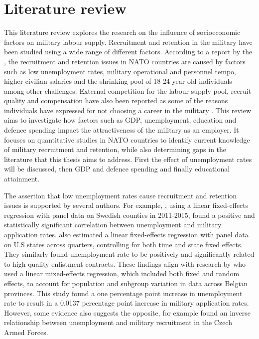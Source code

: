 \chapter{Literature review}

This literature review explores the research on the influence of socioeconomic 
factors on military labour supply. 
Recruitment and retention in the military have been studied using a wide range of
different factors. According to a report by the \textcite{nato_research_and_technology_organization_recruiting_2007}, 
the recruitment and retention issues in NATO countries are 
caused by factors such as low unemployment rates, military operational and personnel tempo,
higher civilian salaries and the shrinking pool of 18-24 year old individuals - among 
other challenges. External
competition for the labour supply pool, recruit quality and compensation have also been 
reported as some of the reasons
individuals have expressed for not choosing a career in the military \parencite{nato_research_and_technology_organization_recruiting_2007}.
This review aims to investigate how 
factors such as GDP, unemployment, education and defence spending impact the 
attractiveness of the military as an employer. It focuses 
on quantitative studies in NATO countries to identify 
current knowledge of military recruitment and retention, while also determining 
gaps in the literature that this thesis aims to address. 
First the effect of unemployment rates will be discussed, then GDP and defence spending 
and finally educational attainment.

The assertion that low unemployment rates 
cause recruitment and retention issues is supported by several authors.
For example, \textcite{backstrom_are_2019}, using a linear fixed-effects regression with panel data 
on Swedish counties in 2011-2015,
found a positive and statistically significant correlation 
between unemployment and military application rates. \textcite{asch_cash_2010} also estimated a
linear fixed-effects regression with panel data on U.S states across quarters, 
controlling for both time and state fixed effects.
They similarly found unemployment rate to be positively and significantly related to
high-quality enlistment contracts. These findings align with 
research by \textcite{balcaen_unemployment_2025} who used a linear mixed-effects regression, 
which included both fixed and random effects, to account for population and subgroup variation
in data across Belgian provinces.
This study found a one percentage point increase in 
unemployment rate to result in a 0.0137 percentage point increase in military 
application rates.
However, some evidence also suggests the opposite, for example 
\textcite{holcner_military_2021} found an inverse relationship between unemployment and military 
recruitment in the Czech Armed Forces.

